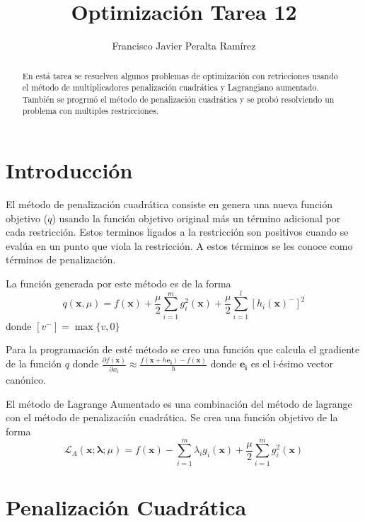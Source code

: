 \documentclass{article}
\title {Optimización Tarea 12}
\author {Francisco Javier Peralta Ramírez}
\begin{document}
\maketitle
\begin{abstract}
  En está tarea se resuelven algunos problemas de optimización con retricciones usando el método de multiplicadores penalización cuadrática y Lagrangiano aumentado. También se progrmó el método de penalización cuadrática y se probó resolviendo un problema con multiples restricciones.
\end{abstract}
\begin{multicols}{2}

\section*{Introducción}

 El método de penalización cuadrática consiste en genera una nueva función objetivo ($q$) usando la función objetivo original más un término adicional por cada restricción. Estos terminos ligados a la restricción son positivos cuando se evalúa en un punto que viola la restricción. A estos términos se les conoce como términos de penalización.

La función generada por este método es de la forma
\vspace{-2ex}
$$q(\boldsymbol{x}, \mu) = f(\boldsymbol{x}) + \frac{\mu}{2} \sum_{i=1}^{m} g_i^2(\boldsymbol{x}) + \frac{\mu}{2} \sum_{i=1}^{l} [h_i(\boldsymbol{x})^-]^2$$
\noindent donde $[v^-] = \max\{v, 0\}$

 Para la programación de esté método se creo una función que calcula el gradiente de la función $q$ donde $\frac{\partial f(\boldsymbol{x})}{\partial x_i} \approx \frac{ f(\boldsymbol{x} + h\boldsymbol{e_i}) - f(\boldsymbol{x}) }{h}$ donde $\boldsymbol{e_i}$ es el i-ésimo vector canónico.


El método de Lagrange Aumentado es una combinación del método de lagrange con el método de penalización cuadrática. Se crea una función objetivo de la forma
\vspace{-2ex}
$$ \mathcal{L}_A(\boldsymbol{x};\boldsymbol{\lambda}; \mu) = f(\boldsymbol{x}) - \sum_{i=1}^{m}\lambda_ig_i(\boldsymbol{x}) + \frac{\mu}{2} \sum_{i=1}^{m} g_i^2(\boldsymbol{x})$$

\section*{Penalización Cuadrática}


\end{multicols}
\end{document}
